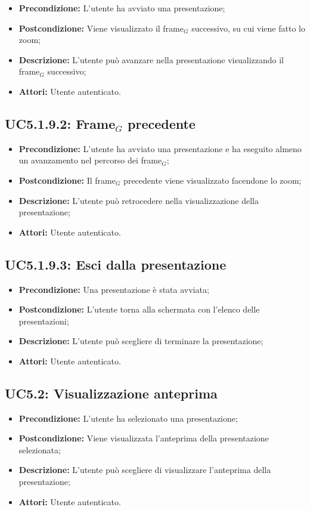 \begin{itemize}
	\item \textbf{Precondizione:} L'utente ha avviato una presentazione;
	\item \textbf{Postcondizione:} Viene visualizzato il frame$_G$ successivo, su cui viene fatto lo zoom;
	\item \textbf{Descrizione:} L'utente può avanzare nella presentazione visualizzando il frame$_G$ successivo;
	\item \textbf{Attori:} Utente autenticato.
\end{itemize}
\subsection{ UC5.1.9.2: Frame$_G$ precedente}

\begin{itemize}
	\item \textbf{Precondizione:} L'utente ha avviato una presentazione e ha eseguito almeno un avanzamento nel percorso dei frame$_G$;
	\item \textbf{Postcondizione:} Il frame$_G$ precedente viene visualizzato facendone lo zoom;
	\item \textbf{Descrizione:} L'utente può retrocedere nella visualizzazione della presentazione;
	\item \textbf{Attori:} Utente autenticato.
\end{itemize}
\subsection{ UC5.1.9.3: Esci dalla presentazione }

\begin{itemize}
	\item \textbf{Precondizione:} Una presentazione è stata avviata;
	\item \textbf{Postcondizione:} L'utente torna alla schermata con l'elenco delle presentazioni;
	\item \textbf{Descrizione:} L'utente può scegliere di terminare la presentazione;
	\item \textbf{Attori:} Utente autenticato.
\end{itemize}
\subsection{ UC5.2: Visualizzazione anteprima }

\begin{itemize}
	\item \textbf{Precondizione:} L'utente ha selezionato una presentazione;
	\item \textbf{Postcondizione:} Viene visualizzata l'anteprima della presentazione selezionata;
	\item \textbf{Descrizione:} L'utente può scegliere di visualizzare l'anteprima della presentazione;
	\item \textbf{Attori:} Utente autenticato.
\end{itemize}

